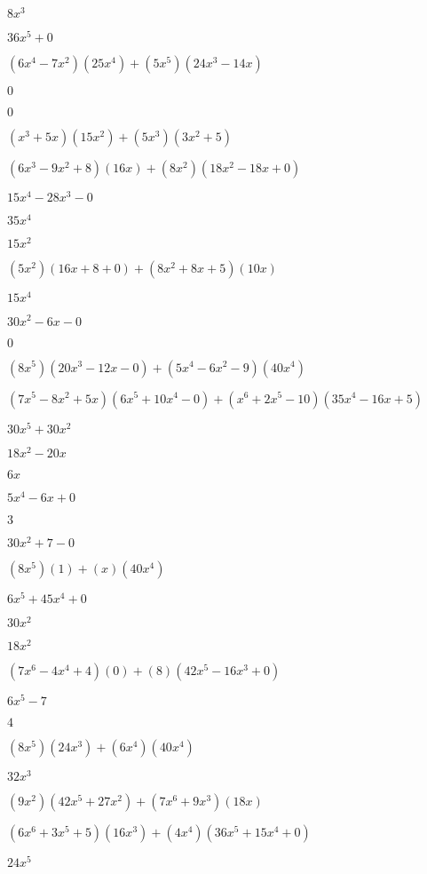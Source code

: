 \documentclass{article}
\begin{document}
\begin{multicols}{2}
$8x^{3}$\item $36x^{5}+0$\item $(6x^{4}-7x^2)(25x^{4})+(5x^{5})(24x^{3}-14x)$\item $0$\item $0$\item $(x^{3}+5x)(15x^{2})+(5x^{3})(3x^{2}+5)$\item $(6x^{3}-9x^2+8)(16x)+(8x^2)(18x^{2}-18x+0)$\item $15x^{4}-28x^{3}-0$\item $35x^{4}$\item $15x^{2}$\item $(5x^2)(16x+8+0)+(8x^2+8x+5)(10x)$\item $15x^{4}$\item $30x^{2}-6x-0$\item $0$\item $(8x^{5})(20x^{3}-12x-0)+(5x^{4}-6x^2-9)(40x^{4})$\item $(7x^{5}-8x^2+5x)(6x^{5}+10x^{4}-0)+(x^{6}+2x^{5}-10)(35x^{4}-16x+5)$\item $30x^{5}+30x^{2}$\item $18x^{2}-20x$\item $6x$\item $5x^{4}-6x+0$\item $3$\item $30x^{2}+7-0$\item $(8x^{5})(1)+(x)(40x^{4})$\item $6x^{5}+45x^{4}+0$\item $30x^{2}$\item $18x^{2}$\item $(7x^{6}-4x^{4}+4)(0)+(8)(42x^{5}-16x^{3}+0)$\item $6x^{5}-7$\item $4$\item $(8x^{5})(24x^{3})+(6x^{4})(40x^{4})$\item $32x^{3}$\item $(9x^2)(42x^{5}+27x^{2})+(7x^{6}+9x^{3})(18x)$\item $(6x^{6}+3x^{5}+5)(16x^{3})+(4x^{4})(36x^{5}+15x^{4}+0)$\item $24x^{5}$\item 
\end{multicols}
\end{document}
